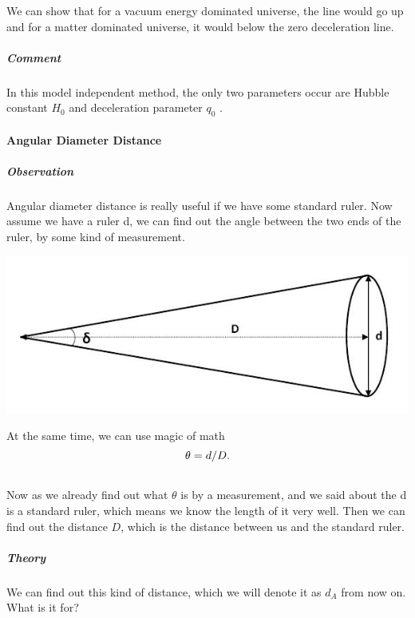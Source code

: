 \documentclass[letterpaper,10pt,english]{sphinxmanual}
\begin{document}
We can show that for a vacuum energy dominated universe, the line would go up and for a matter dominated universe, it would below the zero deceleration line.


\subparagraph{Comment}
\label{Cosmology/cosmoIndex:comment}
In this model independent method, the only two parameters occur are Hubble constant $H_0$ and deceleration parameter $q_0$ .


\paragraph{Angular Diameter Distance}
\label{Cosmology/cosmoIndex:angular-diameter-distance}

\subparagraph{Observation}
\label{Cosmology/cosmoIndex:observation}
Angular diameter distance is really useful if we have some standard ruler. Now assume we have a ruler d, we can find out the angle between the two ends of the ruler, by some kind of measurement.

\includegraphics{AngularDiaFormula.jpg}

At the same time, we can use magic of math
\begin{gather}
\begin{split}\theta = d/D .\end{split}\notag\\\begin{split}\end{split}\notag
\end{gather}
Now as we already find out what $\theta$ is by a measurement, and we said about the d is a standard ruler, which means we know the length of it very well. Then we can find out the distance $D$, which is the distance between us and the standard ruler.


\subparagraph{Theory}
\label{Cosmology/cosmoIndex:theory}
We can find out this kind of distance, which we will denote it as $d_A$ from now on. What is it for?
\end{document}
